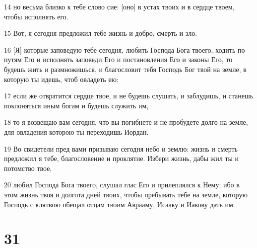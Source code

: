 \par 14 но весьма близко к тебе слово сие: [оно] в устах твоих и в сердце твоем, чтобы исполнять его.
\par 15 Вот, я сегодня предложил тебе жизнь и добро, смерть и зло.
\par 16 [Я] которые заповедую тебе сегодня, любить Господа Бога твоего, ходить по путям Его и исполнять заповеди Его и постановления Его и законы Его, то будешь жить и размножишься, и благословит тебя Господь Бог твой на земле, в которую ты идешь, чтоб овладеть ею;
\par 17 если же отвратится сердце твое, и не будешь слушать, и заблудишь, и станешь поклоняться иным богам и будешь служить им,
\par 18 то я возвещаю вам сегодня, что вы погибнете и не пробудете долго на земле, для овладения которою ты переходишь Иордан.
\par 19 Во свидетели пред вами призываю сегодня небо и землю: жизнь и смерть предложил я тебе, благословение и проклятие. Избери жизнь, дабы жил ты и потомство твое,
\par 20 любил Господа Бога твоего, слушал глас Его и прилеплялся к Нему; ибо в этом жизнь твоя и долгота дней твоих, чтобы пребывать тебе на земле, которую Господь с клятвою обещал отцам твоим Аврааму, Исааку и Иакову дать им.

\chapter{31}

